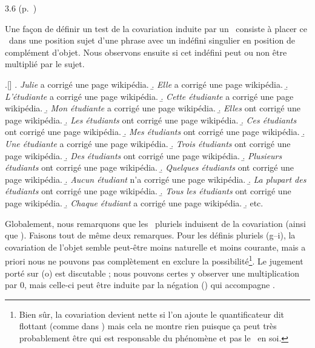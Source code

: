 \begin{Solution}{3.{6}}
(p.~\pageref{exoInduCovar})\label{crg:InduCovar}

Une façon de définir un test de la covariation induite par un \GN\ consiste à placer ce \GN\ dans une position sujet d'une phrase avec un indéfini singulier en position de complément d'objet.  Nous observons ensuite si cet indéfini peut ou non être multiplié par le sujet.

\ex.[]
\a.  \emph{Julie} a corrigé une page wikipédia.
\b.  \emph{Elle} a corrigé une page wikipédia.
\b.  \emph{L'étudiante} a corrigé une page wikipédia.
\b.  \emph{Cette étudiante} a corrigé une page wikipédia.
\b.  \emph{Mon étudiante} a corrigé une page wikipédia.
\b.  \jcovar \emph{Elles} ont corrigé une page wikipédia.
\b.  \jcovar \emph{Les étudiants} ont corrigé une page wikipédia.
\b.  \jcovar \emph{Ces étudiants} ont corrigé une page wikipédia.
\b.  \jcovar \emph{Mes étudiants} ont corrigé une page wikipédia.
\b.  \emph{Une étudiante} a corrigé une page wikipédia.
\b.  \jcovar \emph{Trois étudiants} ont corrigé une page wikipédia.
\b.  \jcovar \emph{Des étudiants} ont corrigé une page wikipédia.
\b.  \jcovar \emph{Plusieurs étudiants} ont corrigé une page wikipédia.
\b.  \jcovar \emph{Quelques étudiants} ont corrigé une page wikipédia.
\b.  \jcovar \emph{Aucun étudiant} n'a corrigé une page wikipédia.
\b.  \jcovar \emph{La plupart des étudiants} ont corrigé une page wikipédia.
\b.  \jcovar \emph{Tous les étudiants} ont corrigé une page wikipédia.
\b.  \jcovar \emph{Chaque étudiant} a corrigé une page wikipédia.
\b. etc.


Globalement, nous remarquons que les \GN\ pluriels induisent de la covariation (ainsi que ).  Faisons tout de même deux remarques.  Pour les définis pluriels (g--i), la covariation de l'objet semble peut-être moins naturelle et moins courante, mais a priori nous ne pouvons pas complètement en exclure la possibilité\footnote{Bien sûr, la covariation devient nette si l'on ajoute le quantificateur dit flottant  (comme dans ) mais cela ne montre rien puisque ça peut très probablement être  qui est responsable du phénomène et pas le \GN\ en soi.}.  Le jugement porté sur  (o) est discutable ; nous pouvons certes y observer une multiplication par $0$, mais celle-ci peut être induite par la négation () qui accompagne .
\end{Solution}
